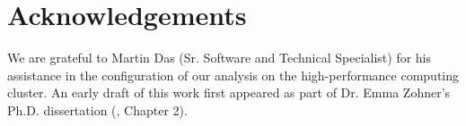 \section*{Acknowledgements}
We are grateful to Martin Das (Sr. Software and Technical Specialist) for his assistance in the configuration of our analysis on the high-performance computing cluster. An early draft of this work first appeared as part of Dr. Emma Zohner's Ph.D. dissertation (\citeyear{zohner_feature_2021}, Chapter 2).

